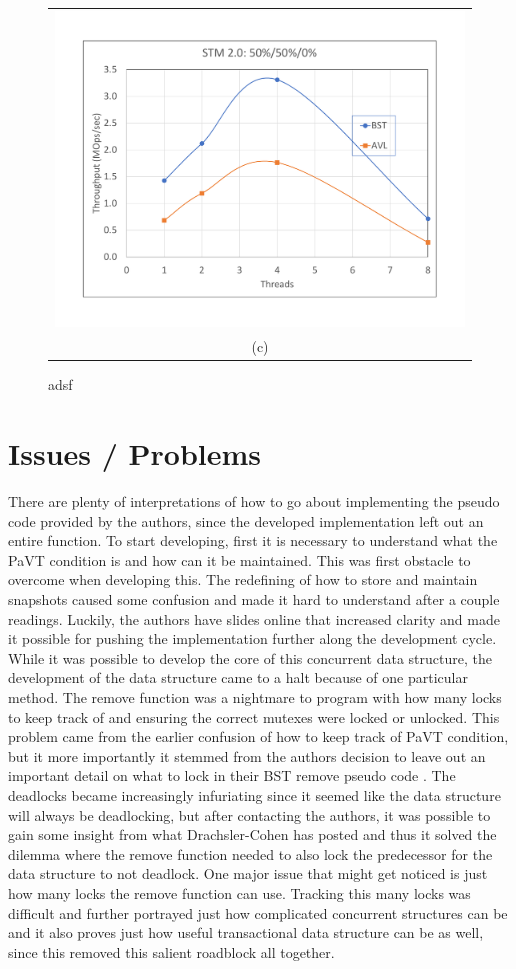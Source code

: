 \documentclass[conference]{IEEEtran}
\begin{document}
\begin{figure}[H]
\begin{tabular}{c}
\includegraphics[width =\linewidth]{figures/stm2-50-50-0} \\
(c) 
\end{tabular}
\caption{adsf}
\end{figure}
\fi

\section{Issues / Problems}
There are plenty of interpretations of how to go about implementing the pseudo code \cite{b1} provided by the authors, since the developed implementation left out an entire function. To start developing, first it is necessary to understand what the PaVT condition is and how can it be maintained. This was first obstacle to overcome when developing this. The redefining of how to store and maintain snapshots caused some confusion and made it hard to understand after a couple readings. Luckily, the authors have slides \cite{b3} online that increased clarity and made it possible for pushing the implementation further along the development cycle. While it was possible to develop the core of this concurrent data structure, the development of the data structure came to a halt because of one particular method. The remove function was a nightmare to program with how many locks to keep track of and ensuring the correct mutexes were locked or unlocked. This problem came from the earlier confusion of how to keep track of PaVT condition, but it more importantly it stemmed from the authors decision to leave out an important detail on what to lock in their BST remove pseudo code \cite{b1}. The deadlocks became increasingly infuriating since it seemed like the data structure will always be deadlocking, but after contacting the authors, it was possible to  gain some insight from what Drachsler-Cohen has posted and thus it solved the dilemma where the remove function needed to also lock the predecessor for the data structure to not deadlock. One major issue that might get noticed is just how many locks the remove function can use. Tracking this many locks was difficult and further portrayed just how complicated concurrent structures can be and it also proves just how useful transactional data structure can be as well, since this removed this salient roadblock all together.
\end{document}
